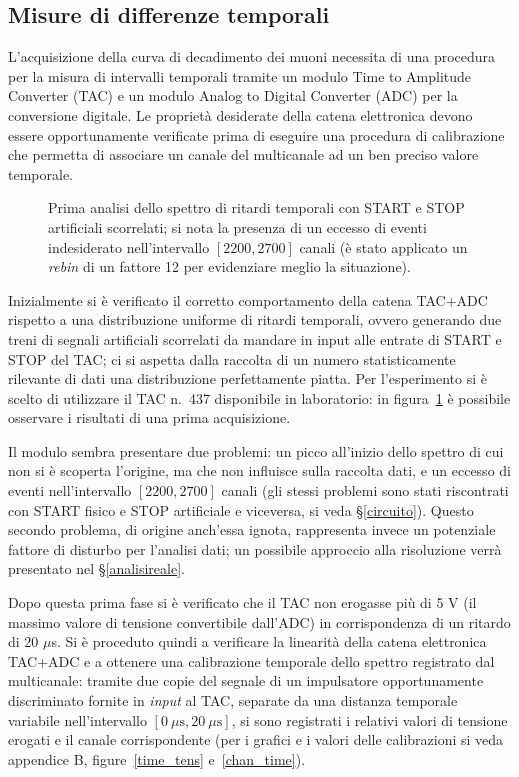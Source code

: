\documentclass[10pt, oneside, a4paper]{article}   	%
\begin{document}
%
\subsection{Misure di differenze temporali}\label{tac}
L'acquisizione della curva di decadimento dei muoni necessita di una procedura per la misura di intervalli temporali tramite un modulo Time to Amplitude Converter (TAC) e un modulo Analog to Digital Converter (ADC) per la conversione digitale. Le proprietà desiderate della catena elettronica devono essere opportunamente verificate prima di eseguire una procedura di calibrazione che permetta di associare un canale del multicanale ad un ben preciso valore temporale.
%
\begin{figure}[b!]
  \centering  
  
  \caption{Prima analisi dello spettro di ritardi temporali con START e STOP artificiali scorrelati; si nota la presenza di un eccesso di eventi indesiderato nell'intervallo $[2200,2700]$ canali (è stato applicato un \emph{rebin} di un fattore 12 per evidenziare meglio la situazione).}
  \label{rumore1}
\end{figure}
%

Inizialmente si è verificato il corretto comportamento della catena TAC+ADC rispetto a una distribuzione uniforme di ritardi temporali, ovvero generando due treni di segnali artificiali scorrelati da mandare in input alle entrate di START e STOP del TAC; ci si aspetta dalla raccolta di un numero statisticamente rilevante di dati una distribuzione perfettamente piatta. Per l'esperimento si è scelto di utilizzare il TAC n.~437 disponibile in laboratorio: in figura~\ref{rumore1} è possibile osservare i risultati di una prima acquisizione.

Il modulo sembra presentare due problemi: un picco all'inizio dello spettro di cui non si è scoperta l'origine, ma che non influisce sulla raccolta dati, e un eccesso di eventi nell'intervallo $[2200,2700]$ canali (gli stessi problemi sono stati riscontrati con START fisico e STOP artificiale e viceversa, si veda \S\ref{circuito}). Questo secondo problema, di origine anch'essa ignota, rappresenta invece un potenziale fattore di disturbo per l'analisi dati; un possibile approccio alla risoluzione verrà presentato nel \S\ref{analisireale}.

Dopo questa prima fase si è verificato che il TAC non erogasse più di 5 V (il massimo valore di tensione convertibile dall'ADC) in corrispondenza di un ritardo di 20 $\mu$s. Si è proceduto quindi a verificare la linearità della catena elettronica TAC+ADC e a ottenere una calibrazione temporale dello spettro registrato dal multicanale: tramite due copie del segnale di un impulsatore opportunamente discriminato fornite in \textit{input} al TAC, separate da una distanza temporale variabile nell'intervallo $[0 \ \mu \mbox{s},20 \ \mu \mbox{s}]$, si sono registrati i relativi valori di tensione erogati e il canale corrispondente (per i grafici e i valori delle calibrazioni si veda appendice B, figure~\ref{time_tens} e~\ref{chan_time}).
\end{document}
